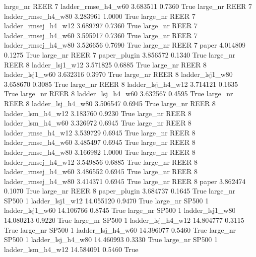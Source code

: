   large_nr     REER                 7  ladder_rmse_h4_w60   3.683511      0.7360    True
  large_nr     REER                 7  ladder_rmse_h4_w80   3.283961      1.0000    True
  large_nr     REER                 7 ladder_rmsej_h4_w12   3.689797      0.7360    True
  large_nr     REER                 7 ladder_rmsej_h4_w60   3.595917      0.7360    True
  large_nr     REER                 7 ladder_rmsej_h4_w80   3.526656      0.7690    True
  large_nr     REER                 7               paper   4.014809      0.1275    True
  large_nr     REER                 7        paper_plugin   3.856572      0.1340    True
  large_nr     REER                 8     ladder_lsj1_w12   3.571825      0.6885    True
  large_nr     REER                 8     ladder_lsj1_w60   3.632316      0.3970    True
  large_nr     REER                 8     ladder_lsj1_w80   3.658670      0.3085    True
  large_nr     REER                 8   ladder_lsj_h4_w12   3.714121      0.1635    True
  large_nr     REER                 8   ladder_lsj_h4_w60   3.632567      0.4595    True
  large_nr     REER                 8   ladder_lsj_h4_w80   3.506547      0.6945    True
  large_nr     REER                 8   ladder_lsm_h4_w12   3.183760      0.9230    True
  large_nr     REER                 8   ladder_lsm_h4_w60   3.326972      0.6945    True
  large_nr     REER                 8  ladder_rmse_h4_w12   3.539729      0.6945    True
  large_nr     REER                 8  ladder_rmse_h4_w60   3.485497      0.6945    True
  large_nr     REER                 8  ladder_rmse_h4_w80   3.166982      1.0000    True
  large_nr     REER                 8 ladder_rmsej_h4_w12   3.549856      0.6885    True
  large_nr     REER                 8 ladder_rmsej_h4_w60   3.486552      0.6945    True
  large_nr     REER                 8 ladder_rmsej_h4_w80   3.414371      0.6945    True
  large_nr     REER                 8               paper   3.862474      0.1070    True
  large_nr     REER                 8        paper_plugin   3.684737      0.1645    True
  large_nr    SP500                 1     ladder_lsj1_w12  14.055120      0.9470    True
  large_nr    SP500                 1     ladder_lsj1_w60  14.106766      0.8745    True
  large_nr    SP500                 1     ladder_lsj1_w80  14.080213      0.9220    True
  large_nr    SP500                 1   ladder_lsj_h4_w12  14.804777      0.3115    True
  large_nr    SP500                 1   ladder_lsj_h4_w60  14.396077      0.5460    True
  large_nr    SP500                 1   ladder_lsj_h4_w80  14.460993      0.3330    True
  large_nr    SP500                 1   ladder_lsm_h4_w12  14.584091      0.5460    True
